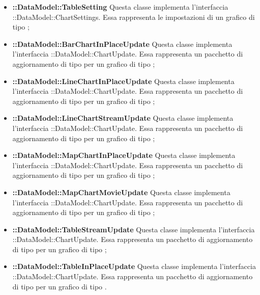 \begin{itemize}
		\item \textbf{::DataModel::TableSetting} Questa classe implementa l'interfaccia ::DataModel::ChartSettings. Essa rappresenta le impostazioni di un grafico di tipo ;

		\item \textbf{::DataModel::BarChartInPlaceUpdate} Questa classe implementa l'interfaccia ::DataModel::ChartUpdate. Essa rappresenta un pacchetto di aggiornamento di tipo  per un grafico di tipo ;

		\item \textbf{::DataModel::LineChartInPlaceUpdate} Questa classe implementa l'interfaccia ::DataModel::ChartUpdate. Essa rappresenta un pacchetto di aggiornamento di tipo  per un grafico di tipo ;

		\item \textbf{::DataModel::LineChartStreamUpdate} Questa classe implementa l'interfaccia ::DataModel::ChartUpdate. Essa rappresenta un pacchetto di aggiornamento di tipo  per un grafico di tipo ;

		\item \textbf{::DataModel::MapChartInPlaceUpdate} Questa classe implementa l'interfaccia ::DataModel::ChartUpdate. Essa rappresenta un pacchetto di aggiornamento di tipo  per un grafico di tipo ;

		\item \textbf{::DataModel::MapChartMovieUpdate} Questa classe implementa l'interfaccia ::DataModel::ChartUpdate. Essa rappresenta un pacchetto di aggiornamento di tipo  per un grafico di tipo ;

		\item \textbf{::DataModel::TableStreamUpdate} Questa classe implementa l'interfaccia ::DataModel::ChartUpdate. Essa rappresenta un pacchetto di aggiornamento di tipo  per un grafico di tipo ;

		\item \textbf{::DataModel::TableInPlaceUpdate} Questa classe implementa l'interfaccia ::DataModel::ChartUpdate. Essa rappresenta un pacchetto di aggiornamento di tipo  per un grafico di tipo .
	\end{itemize}
